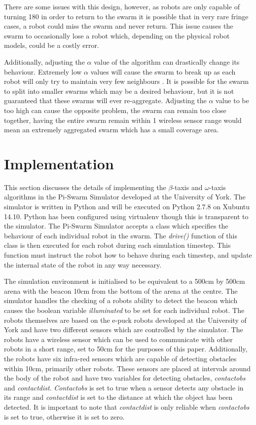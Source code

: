 \documentclass[conference]{IEEEtran}
\begin{document}
There are some issues with this design, however, as robots are only capable of turning 180\degree{} in order to return to the swarm it is possible that in very rare fringe cases, a robot could miss the swarm and never return. This issue causes the swarm to occasionally lose a robot which, depending on the physical robot models, could be a costly error. 

Additionally, adjusting the $\alpha$ value of the algorithm can drastically change its behaviour. Extremely low $\alpha$ values will cause the swarm to break up as each robot will only try to maintain very few neighbours \cite{bjerknes_analysis_2007}. It is possible for the swarm to split into smaller swarms which may be a desired behaviour, but it is not guaranteed that these swarms will ever re-aggregate. Adjusting the $\alpha$ value to be too high can cause the opposite problem, the swarm can remain too close together, having the entire swarm remain within 1 wireless sensor range would mean an extremely aggregated swarm which has a small coverage area.

\section{Implementation}

This section discusses the details of implementing the $\beta$-taxis and $\omega$-taxis algorithms in the Pi-Swarm Simulator developed at the University of York. The simulator is written in Python and will be executed on Python 2.7.8 on Xubuntu 14.10. Python has been configured using virtualenv though this is transparent to the simulator. The Pi-Swarm Simulator accepts a class which specifies the behaviour of each individual robot in the swarm. The \textit{drive()} function of this class is then executed for each robot during each simulation timestep. This function must instruct the robot how to behave during each timestep, and update the internal state of the robot in any way necessary. 

The simulation environment is initialised to be equivalent to a 500cm by 500cm arena with the beacon 10cm from the bottom of the arena at the centre. The simulator handles the checking of a robots ability to detect the beacon which causes the boolean variable \textit{illuminated} to be set for each individual robot. The robots themselves are based on the e-puck robots developed at the University of York and have two different sensors which are controlled by the simulator. The robots have a wireless sensor which can be used to communicate with other robots in a short range, set to 50cm for the purposes of this paper. Additionally, the robots have six infra-red sensors which are capable of detecting obstacles within 10cm, primarily other robots. These sensors are placed at intervals around the body of the robot and have two variables for detecting obstacles, \textit{contactobs} and \textit{contactdist}. \textit{Contactobs} is set to true when a sensor detects any obstacle in its range and \textit{contactdist} is set to the distance at which the object has been detected. It is important to note that \textit{contactdist} is only reliable when \textit{contactobs} is set to true, otherwise it is set to zero.
\end{document}
